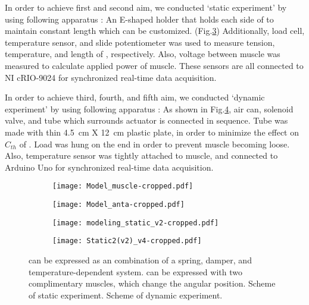 In order to achieve first and second aim, we conducted `static experiment' by using following apparatus : An E-shaped holder that holds each side of \scp to maintain constant length which can be customized. (Fig.\ref{static_sch}) Additionally, load cell, temperature sensor, and slide potentiometer was used to measure tension, temperature, and length of \scpnospace, respectively. Also, voltage between muscle was measured to calculate applied power of muscle. These sensors are all connected to NI cRIO-9024 for synchronized real-time data acquisition.

In order to achieve third, fourth, and fifth aim, we conducted `dynamic experiment' by using following apparatus : As shown in Fig.\ref{dynamic_sch}, air can, solenoid valve, and tube which surrounds actuator is connected in sequence. 
Tube was made with thin \SI{4.5}{\centi\meter} X \SI{12}{\centi\meter} plastic plate, in order to minimize the effect on $C_{th}$ of \scpnospace.
Load was hung on the end in order to prevent muscle becoming loose. 
Also, temperature sensor was tightly attached to muscle, and connected to Arduino Uno for synchronized real-time data acquisition.



\begin{figure}[t]
	\centering
	\begin{subfigure}[t]{0.2\textwidth}
		\centering\texttt{[image: Model\_muscle-cropped.pdf]}
		\caption{\label{ModelMus}}
	\end{subfigure}
	\begin{subfigure}[t]{0.31\textwidth}
		\centering\texttt{[image: Model\_anta-cropped.pdf]}
		\caption{\label{ModelAnt}}
	\end{subfigure}
	\begin{subfigure}[t]{0.22\textwidth}
		\centering\texttt{[image: modeling\_static\_v2-cropped.pdf]}
		\caption{\label{static_sch}}
	\end{subfigure}
	\begin{subfigure}[t]{0.22\textwidth}
		\centering\texttt{[image: Static2(v2)\_v4-cropped.pdf]} %
		\caption{\label{dynamic_sch}}
	\end{subfigure}
	\caption[Modeling of \scp]{ \scp can be expressed as an combination of a spring, damper, and temperature-dependent system.  \Anta can be expressed with two complimentary muscles, which change the angular position.  Scheme of static experiment.  Scheme of dynamic experiment.}
	\label{model+exp_sch}
\end{figure}

